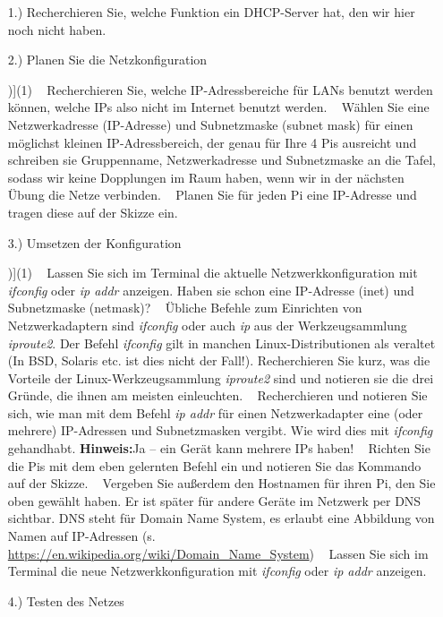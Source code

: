 \documentclass[paper=a4,fontsize=11pt]{scrartcl}%
\numberwithin{equation}{section}
\begin{document}
\begin{itemize}
\item[1.)] Recherchieren Sie, welche Funktion ein DHCP-Server hat, den wir hier noch nicht haben.
\item[2.)] Planen Sie die Netzkonfiguration
\begin{tasks}[counter-format=(tsk[r])](1)
	\task~ Recherchieren Sie, welche IP-Adressbereiche für LANs benutzt werden können, welche IPs also nicht im Internet benutzt werden.
	\task~ Wählen Sie eine Netzwerkadresse (IP-Adresse) und Subnetzmaske (subnet mask) für einen möglichst kleinen IP-Adressbereich, der genau für Ihre 4 Pis ausreicht und schreiben sie Gruppenname, Netzwerkadresse und Subnetzmaske an die Tafel, sodass wir keine Dopplungen im Raum haben, wenn wir in der nächsten Übung die Netze verbinden.
	\task~ Planen Sie für jeden Pi eine IP-Adresse und tragen diese auf der Skizze ein.
\end{tasks}
\item[3.)] Umsetzen der Konfiguration
\begin{tasks}[counter-format=(tsk[r])](1)
	\task~ Lassen Sie sich im Terminal die aktuelle Netzwerkkonfiguration mit \emph{ifconfig} oder \emph{ip addr} anzeigen. Haben sie schon eine IP-Adresse (inet) und Subnetzmaske (netmask)?
	\task~ Übliche Befehle zum Einrichten von Netzwerkadaptern sind \emph{ifconfig} oder auch \emph{ip} aus der Werkzeugsammlung \emph{iproute2}. Der Befehl \emph{ifconfig} gilt in manchen Linux-Distributionen als veraltet (In BSD, Solaris etc. ist dies nicht der Fall!). Recherchieren Sie kurz, was die Vorteile der Linux-Werkzeugsammlung \emph{iproute2} sind und notieren sie die drei Gründe, die ihnen am meisten einleuchten.
	\task~ Recherchieren und notieren Sie sich, wie man mit dem Befehl \emph{ip addr} für einen Netzwerkadapter eine (oder mehrere) IP-Adressen und Subnetzmasken vergibt. Wie wird dies mit \emph{ifconfig} gehandhabt. \textbf{Hinweis:}Ja -- ein Gerät kann mehrere IPs haben!
	\task~ Richten Sie die Pis mit dem eben gelernten Befehl ein und notieren Sie das Kommando auf der Skizze.
	\task~ Vergeben Sie außerdem den Hostnamen für ihren Pi, den Sie oben gewählt haben. Er ist später für andere Geräte im Netzwerk per DNS sichtbar. DNS steht für Domain Name System, es erlaubt eine Abbildung von Namen auf IP-Adressen (s. \url{https://en.wikipedia.org/wiki/Domain_Name_System}) 
	\task~ Lassen Sie sich im Terminal die neue Netzwerkkonfiguration mit \emph{ifconfig} oder \emph{ip addr} anzeigen.
\end{tasks}
\item[4.)] Testen des Netzes

\end{itemize}
\end{document}

